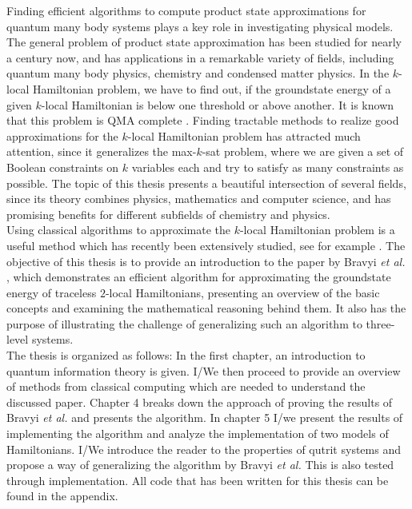 Finding efficient algorithms to compute product state approximations for quantum many body systems plays a key role in investigating physical models.
The general problem of product state approximation has been studied for nearly a century now, and has applications in a remarkable variety of fields, including quantum many body physics, chemistry and condensed matter physics.
In the $k$-local Hamiltonian problem, we have to find out, if the groundstate energy of a given $k$-local Hamiltonian is below one threshold or above another.
It is known that this problem is QMA complete \cite{kempe06}.
Finding tractable methods to realize good approximations for the $k$-local Hamiltonian problem has attracted much attention, since it generalizes the max-$k$-sat problem, where we are given a set of Boolean constraints on $k$ variables each and try to satisfy as many constraints as possible.
The topic of this thesis presents a beautiful intersection of several fields, since its theory combines physics, mathematics and computer science, and has promising benefits for different subfields of chemistry and physics.\\
Using classical algorithms to approximate the $k$-local Hamiltonian problem is a useful method which has recently been extensively studied, see for example \cite{gharibian19, gharibian12, kempe06, brandao14, harrow17,bravyi19,anshu20}.
The objective of this thesis is to provide an introduction to the paper by Bravyi \emph{et al.} \cite{bravyi19}, which demonstrates an efficient algorithm for approximating the groundstate energy of traceless $2$-local Hamiltonians, presenting an overview of the basic concepts and examining the mathematical reasoning behind them.
It also has the purpose of illustrating the challenge of generalizing such an algorithm to three-level systems.\\
The thesis is organized as follows:
In the first chapter, an introduction to quantum information theory is given.
I/We then proceed to provide an overview of methods from classical computing which are needed to understand the discussed paper.
Chapter 4 breaks down the approach of proving the results of Bravyi \emph{et al.} and presents the algorithm.
In chapter 5 I/we present the results of implementing the algorithm and analyze the implementation of two models of Hamiltonians.
I/We introduce the reader to the properties of qutrit systems and propose a way of generalizing the algorithm by Bravyi \emph{et al.}
This is also tested through implementation.
All code that has been written for this thesis can be found in the appendix.
